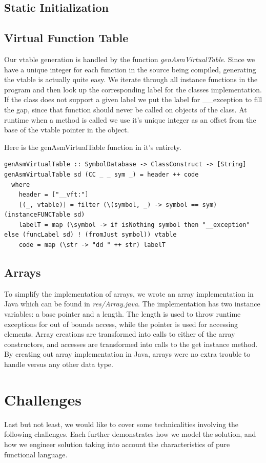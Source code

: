 \documentclass[12pt,letterpaper]{article}
\begin{document}
\subsection{Static Initialization}

\subsection{Virtual Function Table}
Our vtable generation is handled by the function \emph{genAsmVirtualTable}.
Since we have a unique integer for each function in the source being compiled, generating the vtable is actually quite easy.
We iterate through all instance functions in the program and then look up the corresponding label for the classes implementation.
If the class does not support a given label we put the label for \_\_exception to fill the gap, since that function should never be called on objects of the class.
At runtime when a method is called we use it's unique integer as an offset from the base of the vtable pointer in the object.

Here is the genAsmVirtualTable function in it's entirety.
\begin{lstlisting}
genAsmVirtualTable :: SymbolDatabase -> ClassConstruct -> [String]
genAsmVirtualTable sd (CC _ _ sym _) = header ++ code
  where
    header = ["__vft:"]
    [(_, vtable)] = filter (\(symbol, _) -> symbol == sym) (instanceFUNCTable sd)
    labelT = map (\symbol -> if isNothing symbol then "__exception" else (funcLabel sd) ! (fromJust symbol)) vtable
    code = map (\str -> "dd " ++ str) labelT
\end{lstlisting}

\subsection{Arrays}
To simplify the implementation of arrays, we wrote an array implementation in Java which can be found in \emph{res/Array.java}.
The implementation has two instance variables: a base pointer and a length.
The length is used to throw runtime exceptions for out of bounds access, while the pointer is used for accessing elements.
Array creations are transformed into calls to either of the array constructors, and accesses are transformed into calls to the get instance method.
By creating out array implementation in Java, arrays were no extra trouble to handle versus any other data type.

\section{Challenges}
Last but not least, we would like to cover some technicalities involving the following challenges. Each further demonstrates how we model the solution, and how we engineer solution taking into account the characteristics of pure functional language.
\end{document}
